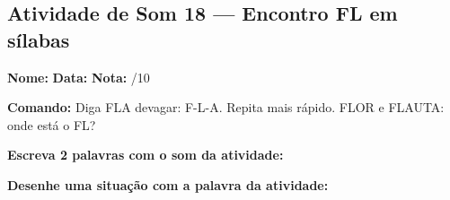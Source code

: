 \subsection{Atividade de Som 18 --- Encontro FL em sílabas}
\begin{exercicio}



\noindent\textbf{Nome:} \underline{\hspace{3.2cm}} \quad \textbf{Data:} \underline{\hspace{1.6cm}} \quad \textbf{Nota:} \underline{\hspace{0.9cm}}/10


\noindent\textbf{Comando:} Diga FLA devagar: F-L-A. Repita mais rápido. FLOR e FLAUTA: onde está o FL?


\begin{center}
\end{center}

\noindent\textbf{Escreva 2 palavras com o som da atividade:}

\begin{center}
  \underline{\hspace{3cm}} \quad \underline{\hspace{3cm}}
\end{center}

\noindent\textbf{Desenhe uma situação com a palavra da atividade:}

\begin{center}
\end{center}

\end{exercicio}



